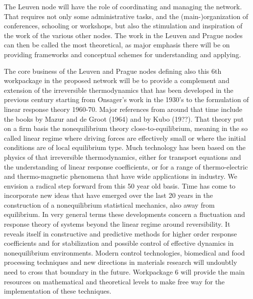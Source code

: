 \begin{workpackage}[id=WPcore,wphases=0-48,
  short=Gen. Theory, %
  title=General Theory, %
  lead=KUL,
  KULRM=36]

\begin{wpobjectives}

\end{wpobjectives}

\begin{wpdescription}

The Leuven node will have the role of coordinating and managing the network. That requires
not only some administrative tasks, and the (main-)organization of conferences, schooling or
workshops, but also the stimulation and inspiration of the work of the various other
nodes. The work in the Leuven and Prague nodes can then be called the most theoretical, as
major emphasis there will be on providing frameworks and conceptual schemes for
understanding and applying.

The core business of the Leuven and Prague nodes defining also this 6th workpackage in the
proposed network will be to provide a complement and extension of the irreversible
thermodynamics that has been developed in the previous century starting from Onsager's work
in the 1930's to the formulation of linear response theory 1960-70.  Major references from
around that time include the books by Mazur and de Groot (1964) and by Kubo (19??).
%
That theory put on a firm basis the nonequilibrium theory close-to-equilibrium, meaning in
the so called linear regime where driving forces are effectively small or where the initial
conditions are of local equilibrium type. Much technology has been based on the physics of
that irreversible thermodynamics, either for transport equations and the understanding of
linear response coefficients, or for a range of thermo-electric and thermo-magnetic
phenomena that have wide applications in industry.
%
We envision a radical step forward from this 50 year old basis. Time has come to incorporate
new ideas that have emerged over the last 20 years in the construction of a nonequilibrium
statistical mechanics, also away from equilibrium. In very general terms these developments
concern a fluctuation and response theory of systems beyond the linear regime around
reversibility. It reveals itself in constructive and predictive methods for higher order
response coefficients and for stabilization and possible control of effective dynamics in
nonequilibrium environments.
%
Modern control technologies, biomedical and food processing techniques and new directions in
materials research will undoubtly need to cross that boundary in the future. Workpackage 6
will provide the main resources on mathematical and theoretical levels to make free way for
the implementation of these techniques.


\end{wpdescription}
\end{workpackage}
